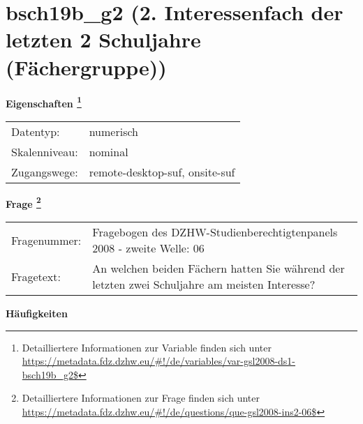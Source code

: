 
    \setcounter{footnote}{0}

    \vspace*{-1.8cm}
	\section{bsch19b\_g2 (2. Interessenfach der letzten 2 Schuljahre (Fächergruppe))}
	\label{section:bsch19b_g2}



    \vspace*{0.5cm}
    \noindent\textbf{Eigenschaften
	\footnote{Detailliertere Informationen zur Variable finden sich unter
		\url{https://metadata.fdz.dzhw.eu/\#!/de/variables/var-gsl2008-ds1-bsch19b_g2$}}}\\
	\begin{tabularx}{\hsize}{@{}lX}
	Datentyp: & numerisch \\
	Skalenniveau: & nominal \\
	Zugangswege: &
	  remote-desktop-suf, 
	  onsite-suf
 \\
    \end{tabularx}



				\vspace*{0.5cm}
                \noindent\textbf{Frage
	                \footnote{Detailliertere Informationen zur Frage finden sich unter
		              \url{https://metadata.fdz.dzhw.eu/\#!/de/questions/que-gsl2008-ins2-06$}}}\\
				\begin{tabularx}{\hsize}{@{}lX}
					Fragenummer: &
					  Fragebogen des DZHW-Studienberechtigtenpanels 2008 - zweite Welle:
					  06
 \\
					Fragetext: & An welchen beiden Fächern hatten Sie während der letzten zwei Schuljahre am meisten Interesse? \\
				\end{tabularx}





        		\vspace*{0.5cm}
                \noindent\textbf{Häufigkeiten}

